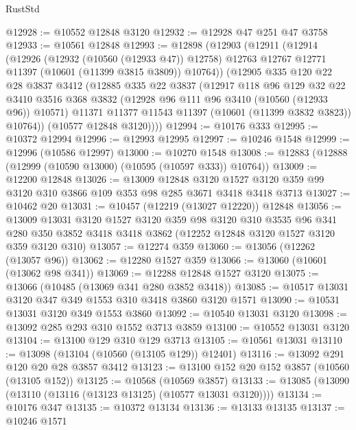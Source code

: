\begin{lexlean}{RustStd}
\begin{coremodule}
@12928 := @10552 @12848 @3120
@12932 := @12928 @47 @251 @47 @3758
@12933 := @10561 @12848
@12993 := @12898
    (@12903
      (@12911
        (@12914
          (@12926
            (@12932 (@10560 (@12933 @47)) @12758)
            @12763
            @12767
            @12771
            @11397
            (@10601 (@11399 @3815 @3809))
            @10764))
        (@12905
          @335
          @120
          @22
          @28
          @3837
          @3412
          (@12885
            @335
            @22
            @3837
            (@12917
              @118
              @96
              @129
              @32
              @22
              @3410
              @3516
              @368
              @3832
              (@12928 @96 @111 @96 @3410 (@10560 (@12933 @96)) @10571)
              @11371
              @11377
              @11543
              @11397
              (@10601 (@11399 @3832 @3823))
              @10764))
          (@10577 @12848 @3120))))
@12994 := @10176 @333
@12995 := @10372 @12994
@12996 := @12993 @12995
@12997 := @10246 @1548
@12999 := @12996 (@10586 @12997)
@13000 := @10270 @1548
@13008 := @12883 (@12888 (@12999 (@10590 @13000) (@10595 (@10597 @333)) @10764))
@13009 := @12200 @12848
@13026 := @13009
    @12848
    @3120
    @1527
    @3120
    @359
    @99
    @3120
    @310
    @3866
    @109
    @353
    @98
    @285
    @3671
    @3418
    @3418
    @3713
@13027 := @10462 @20
@13031 := @10457 (@12219 (@13027 @12220)) @12848
@13056 := @13009
    @13031
    @3120
    @1527
    @3120
    @359
    @98
    @3120
    @310
    @3535
    @96
    @341
    @280
    @350
    @3852
    @3418
    @3418
    @3862
    (@12252 @12848 @3120 @1527 @3120 @359 @3120 @310)
@13057 := @12274 @359
@13060 := @13056 (@12262 (@13057 @96))
@13062 := @12280 @1527 @359
@13066 := @13060 (@10601 (@13062 @98 @341))
@13069 := @12288 @12848 @1527 @3120
@13075 := @13066 (@10485 (@13069 @341 @280 @3852 @3418))
@13085 := @10517 @13031 @3120 @347 @349 @1553 @310 @3418 @3860 @3120 @1571
@13090 := @10531 @13031 @3120 @349 @1553 @3860
@13092 := @10540 @13031 @3120
@13098 := @13092 @285 @293 @310 @1552 @3713 @3859
@13100 := @10552 @13031 @3120
@13104 := @13100 @129 @310 @129 @3713
@13105 := @10561 @13031
@13110 := @13098 (@13104 (@10560 (@13105 @129)) @12401)
@13116 := @13092 @291 @120 @20 @28 @3857 @3412
@13123 := @13100 @152 @20 @152 @3857 (@10560 (@13105 @152))
@13125 := @10568 (@10569 @3857)
@13133 := @13085 (@13090 (@13110 (@13116 (@13123 @13125) (@10577 @13031 @3120))))
@13134 := @10176 @347
@13135 := @10372 @13134
@13136 := @13133 @13135
@13137 := @10246 @1571

\end{coremodule}
\end{lexlean}
